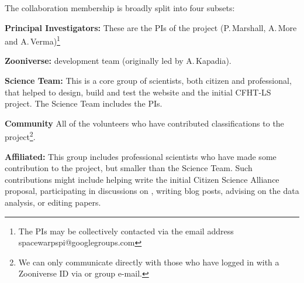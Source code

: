 \documentclass[a4paper]{article}
\begin{document}
The collaboration membership is broadly split into four subsets:

\begin{description}

\item{\bf Principal Investigators:} These are the PIs of the \sw project (P.\,Marshall, 
A.\,More and A.\,Verma)\footnote{The PIs may be collectively contacted via the email address spacewarpspi@googlegroups.com}

\item{\bf Zooniverse:} \sw development team (originally led by
A.\,Kapadia).

\item{\bf Science Team:} This is a core group of scientists, both citizen and
professional, that helped to design, build and test the \sw website
and the initial CFHT-LS project. The Science Team includes the \sw PIs.

\item{\bf Community} All of the volunteers who have contributed
classifications to the project\footnote{We can only communicate directly with those who have logged in with a Zooniverse ID via \Talk or group e-mail.}.

\item{\bf Affiliated:} This group includes professional scientists who have made some contribution to the \sw project, but smaller than the Science Team. Such contributions might include helping write the initial
Citizen Science Alliance proposal, participating in discussions on
\Talk, writing \sw blog posts, advising on the data analysis, or editing
papers.

\end{description}






\end{document}
